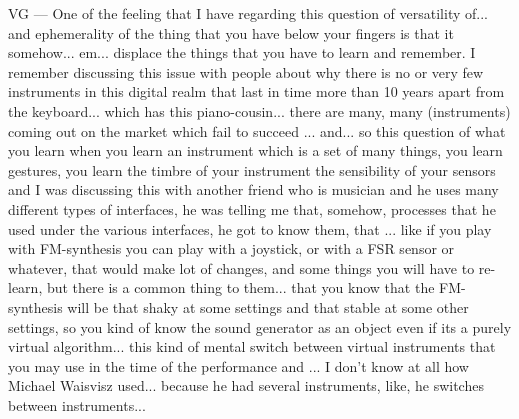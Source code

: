 VG — One of the feeling that I have regarding  this question of versatility of... and ephemerality of the thing that you have below your fingers is that it somehow... em... displace the things that you have  to learn and remember. I remember discussing this issue with people about why there is no or very few instruments in this digital realm that last in time more than 10 years apart from the keyboard... which has this piano-cousin... there are many, many (instruments) coming out on the market which fail to succeed ... and... so this question of what you learn when you learn  an instrument which is a set of many things, you learn gestures, you learn the timbre of your instrument the sensibility of your sensors and I was discussing this with another friend who is musician and he uses many different types of interfaces, he was telling me that, somehow, processes that he used under the various interfaces, he got to know them, that ... like if you play with FM-synthesis you can play with a joystick, or with a FSR sensor or whatever, that would make lot of changes,  and some things you will have to re-learn, but there is a common thing to them... that you know that the FM-synthesis will be that shaky at some settings and that stable at some other settings, so you kind of know the sound  generator as an object even if its a purely virtual algorithm... this kind of mental switch  between virtual instruments that you may use in the time of the performance and ... I don't know at all how Michael Waisvisz used... because he had several instruments, like, he switches between instruments... 

